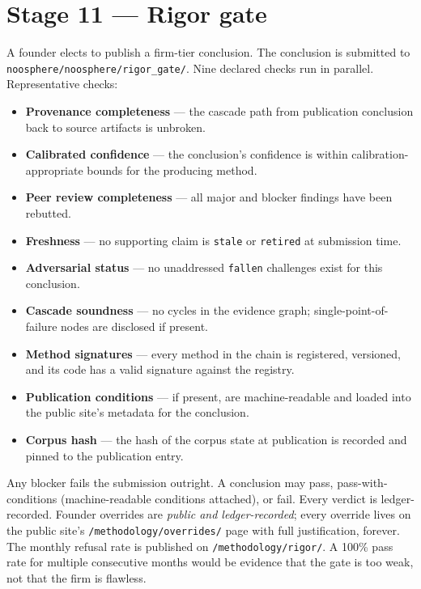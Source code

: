 \documentclass[11pt,letterpaper]{article}
\newcommand{\file}[1]{\texttt{#1}}
\begin{document}
\section{Stage 11 --- Rigor gate}

A founder elects to publish a firm-tier conclusion. The conclusion is submitted to \file{noosphere/noosphere/rigor\_gate/}. Nine declared checks run in parallel. Representative checks:

\begin{itemize}[leftmargin=1.5em,itemsep=0.1em]
\item \textbf{Provenance completeness} --- the cascade path from publication conclusion back to source artifacts is unbroken.
\item \textbf{Calibrated confidence} --- the conclusion's confidence is within calibration-appropriate bounds for the producing method.
\item \textbf{Peer review completeness} --- all major and blocker findings have been rebutted.
\item \textbf{Freshness} --- no supporting claim is \texttt{stale} or \texttt{retired} at submission time.
\item \textbf{Adversarial status} --- no unaddressed \texttt{fallen} challenges exist for this conclusion.
\item \textbf{Cascade soundness} --- no cycles in the evidence graph; single-point-of-failure nodes are disclosed if present.
\item \textbf{Method signatures} --- every method in the chain is registered, versioned, and its code has a valid signature against the registry.
\item \textbf{Publication conditions} --- if present, are machine-readable and loaded into the public site's metadata for the conclusion.
\item \textbf{Corpus hash} --- the hash of the corpus state at publication is recorded and pinned to the publication entry.
\end{itemize}

Any blocker fails the submission outright. A conclusion may pass, pass-with-conditions (machine-readable conditions attached), or fail. Every verdict is ledger-recorded. Founder overrides are \emph{public and ledger-recorded}; every override lives on the public site's \file{/methodology/overrides/} page with full justification, forever. The monthly refusal rate is published on \file{/methodology/rigor/}. A 100\% pass rate for multiple consecutive months would be evidence that the gate is too weak, not that the firm is flawless.
\end{document}
